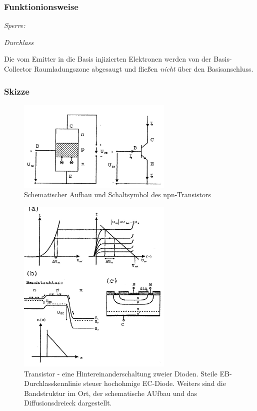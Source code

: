     \subsubsection{Funktionionsweise}
    \emph{Sperre:} 
    
    \emph{Durchlass}
    
    Die vom Emitter in die Basis injizierten Elektronen werden von der Basis-Collector Raumladungszone abgesaugt und fließen \textit{nicht} über den Basisanschluss. 
    
    
    \subsubsection{Skizze}
    
    \begin{figure}
        \centering
        \includegraphics[width=0.66\textwidth]{fig/npn-transistor.jpg}
        \caption{Schematischer Aufbau und Schaltsymbol des npn-Transistors}
        \label{fig:npnTransistor}
    \end{figure}
    
    \begin{figure}
        \centering
        \includegraphics[width=0.66\textwidth]{fig/npn-transistor-kennlinien.jpg}
        \caption{Transistor - eine Hintereinanderschaltung zweier Dioden. Steile EB-Durchlasskennlinie steuer hochohmige EC-Diode. Weiters sind die Bandstruktur im Ort, der schematische AUfbau und das Diffusionsdreieck dargestellt.}
        \label{fig:npnTransistorKennlinie}
    \end{figure}
    
